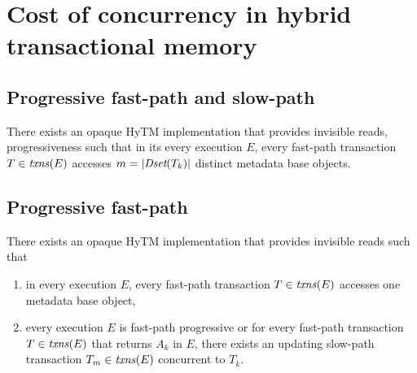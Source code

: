 \section{Cost of concurrency in hybrid transactional memory}
%
\subsection{Progressive fast-path and slow-path}
%

%
\begin{theorem}
\label{th:inswrite}
There exists an opaque HyTM implementation that provides invisible reads, progressiveness
such that
in its every execution $E$, every fast-path transaction $T\in \ms{txns}(E)$
accesses $m=|\textit{Dset}(T_k)|$ distinct metadata base objects.
\end{theorem}
%
\subsection{Progressive fast-path}
%
\begin{theorem}
\label{th:inswrite2}
There exists an opaque HyTM implementation that provides invisible reads
such that 
\begin{enumerate}
 \item 
in every execution $E$,
every fast-path transaction $T\in \ms{txns}(E)$
accesses one metadata base object,
\item
every execution $E$ is fast-path progressive or for
every fast-path transaction $T\in \ms{txns}(E)$
that returns $A_k$ in $E$, there exists an updating slow-path transaction $T_m \in \ms{txns}(E)$
concurrent to $T_k$.
\end{enumerate}
\end{theorem}


%
%
